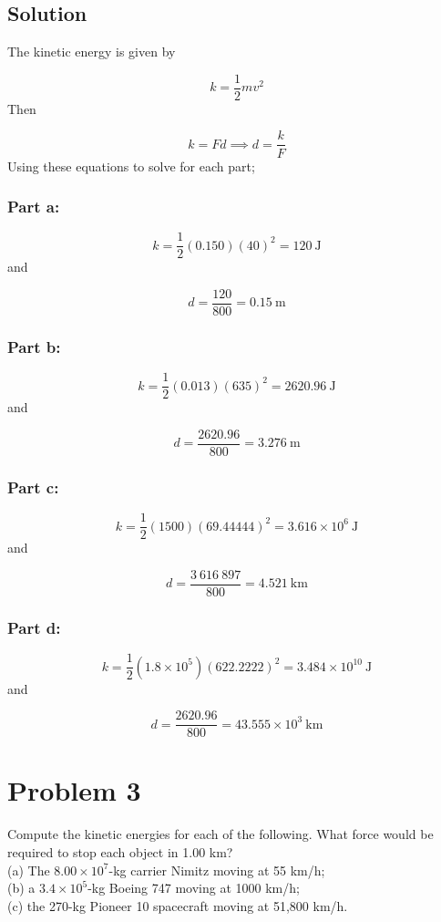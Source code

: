 \documentclass{article}
\begin{document}
\subsection*{Solution}
The kinetic energy is given by

\begin{equation}
	k = \frac{1}{2}mv^2
\end{equation}
Then

\[
	k = Fd \implies d = \frac{k}{F}
\]
Using these equations to solve for each part;
\subsubsection*{Part a:}
\[
	k = \frac{1}{2} (0.150)(40)^2 = \boxed{120\ \text{J}}
\]
and

\[
	d = \frac{120}{800} = \boxed{0.15\ \text{m}}
\]

\subsubsection*{Part b:}
\[
	k = \frac{1}{2} (0.013)(635)^2 = \boxed{2620.96\ \text{J}}
\]
and

\[
	d = \frac{2620.96}{800} = \boxed{3.276\ \text{m}}
\]

\subsubsection*{Part c:}
\[
	k = \frac{1}{2} (1500)(69.44444)^2 = \boxed{3.616 \times 10^6\ \text{J}}
\]
and

\[
	d = \frac{3\ 616\ 897}{800} = \boxed{4.521\ \text{km}}
\]

\subsubsection*{Part d:}
\[
	k = \frac{1}{2} (1.8 \times 10^5)(622.2222)^2 = \boxed{3.484\times10^{10}\ \text{J}}
\]
and

\[
	d = \frac{2620.96}{800} = \boxed{43.555 \times 10^3\ \text{km}}
\]


\section*{Problem 3}
Compute the kinetic energies for each of the following. What force would be required to stop each object in
1.00 km? \\
(a) The $8.00 \times 10^7$-kg carrier Nimitz moving at 55 km/h; \\
(b) a $3.4 \times 10^5$-kg Boeing 747 moving at 1000 km/h; \\
(c) the 270-kg Pioneer 10 spacecraft moving at 51,800 km/h.
\end{document}

